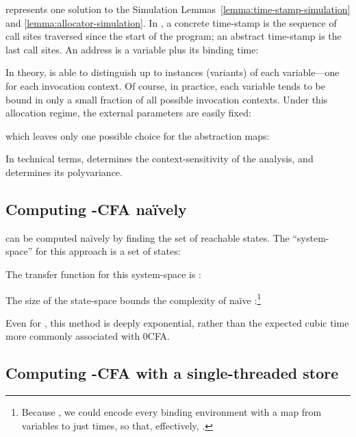 \kCFA{} represents one solution to the Simulation
Lemmas~\ref{lemma:time-stamp-simulation} and
\ref{lemma:allocator-simulation}.
In \kCFA{}, a concrete time-stamp is the sequence of call
sites traversed since the start of the program; an abstract
time-stamp is the last  call sites.
An address is a variable plus its binding time:
\begin{small}\end{small}In theory, \kCFA{} is able to distinguish up to 
instances (variants) of each variable---one for each invocation
context.
Of course, in practice, each variable tends to be bound in only a
small fraction of all possible invocation contexts.
Under this allocation regime, the external parameters are easily fixed:
\begin{small}\end{small}which leaves only one possible choice for the abstraction maps:
\begin{small}\end{small}In technical terms,  determines the context-sensitivity of the
analysis, and  determines its polyvariance.



\subsection{Computing -CFA na\"ively}

\kCFA{} can be computed na\"ively by finding the set of reachable
states.
The ``system-space'' for this approach is a set of states:
\begin{small}\end{small}The transfer function for this system-space is :
\begin{small}\end{small}The size of the state-space bounds the complexity of na\"ive
\kCFA{}:\footnote{Because , we could encode
  every binding environment with a map from variables to just times,
  so  that, effectively, .}
\begin{small}\end{small}Even for , this method is deeply exponential, rather than the
expected cubic time more commonly associated with 0CFA.




\subsection{Computing -CFA with a single-threaded store} 

